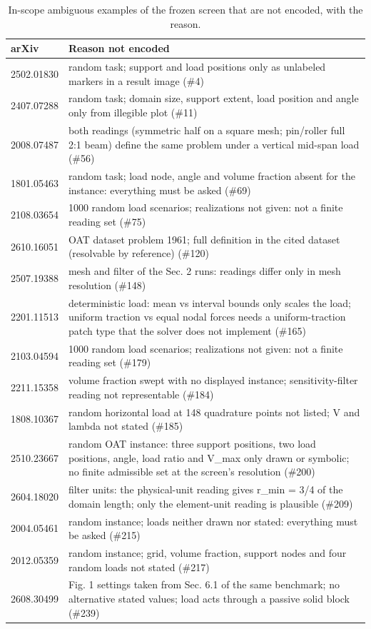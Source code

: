 \begin{table}[t]
\centering\small
\caption{In-scope ambiguous examples of the frozen screen that are not encoded, with the reason.}
\label{tab:tab_not_encoded}
\begin{tabular}{lp{11cm}}
\toprule
arXiv & Reason not encoded \\
\midrule
2502.01830 & random task; support and load positions only as unlabeled markers in a result image (\#4) \\
2407.07288 & random task; domain size, support extent, load position and angle only from illegible plot (\#11) \\
2008.07487 & both readings (symmetric half on a square mesh; pin/roller full 2:1 beam) define the same problem under a vertical mid-span load (\#56) \\
1801.05463 & random task; load node, angle and volume fraction absent for the instance: everything must be asked (\#69) \\
2108.03654 & 1000 random load scenarios; realizations not given: not a finite reading set (\#75) \\
2610.16051 & OAT dataset problem 1961; full definition in the cited dataset (resolvable by reference) (\#120) \\
2507.19388 & mesh and filter of the Sec. 2 runs: readings differ only in mesh resolution (\#148) \\
2201.11513 & deterministic load: mean vs interval bounds only scales the load; uniform traction vs equal nodal forces needs a uniform-traction patch type that the solver does not implement (\#165) \\
2103.04594 & 1000 random load scenarios; realizations not given: not a finite reading set (\#179) \\
2211.15358 & volume fraction swept with no displayed instance; sensitivity-filter reading not representable (\#184) \\
1808.10367 & random horizontal load at 148 quadrature points not listed; V and lambda not stated (\#185) \\
2510.23667 & random OAT instance: three support positions, two load positions, angle, load ratio and V\_max only drawn or symbolic; no finite admissible set at the screen's resolution (\#200) \\
2604.18020 & filter units: the physical-unit reading gives r\_min = 3/4 of the domain length; only the element-unit reading is plausible (\#209) \\
2004.05461 & random instance; loads neither drawn nor stated: everything must be asked (\#215) \\
2012.05359 & random instance; grid, volume fraction, support nodes and four random loads not stated (\#217) \\
2608.30499 & Fig. 1 settings taken from Sec. 6.1 of the same benchmark; no alternative stated values; load acts through a passive solid block (\#239) \\
\bottomrule
\end{tabular}
\end{table}
